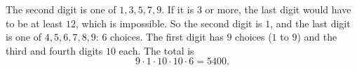 The second digit is one of $1,3,5,7,9$. If it is $3$ or more, the last digit would have to be at least $12$, which is impossible. So the second digit is $1$, and the last digit is one of $4,5,6,7,8,9$: $6$ choices. The first digit has $9$ choices ($1$ to $9$) and the third and fourth digits $10$ each. The total is
\[
9\cdot1\cdot10\cdot10\cdot6=\boxed{5400}.
\]
